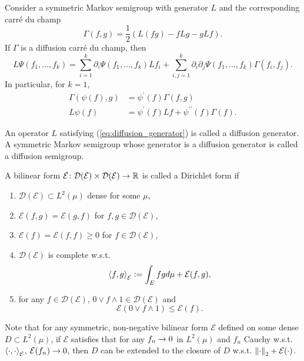 Consider a symmetric Markov semigroup with generator $L$ and the corresponding carr\'e du champ
\begin{equation*}
	\Gamma(f, g)=\frac{1}{2}(L(f g)-f L g-g L f).
\end{equation*}
If $\Gamma$ is a diffusion carr\'e du champ, then
\begin{equation}\label{eq:diffusion_generator}
	L \Psi\left(f_1, \ldots, f_k\right)=\sum_{i=1}^k \partial_i \Psi\left(f_1, \ldots, f_k\right) L f_i+\sum_{i, j=1}^k \partial_i \partial_j \Psi\left(f_1, \ldots, f_k\right) \Gamma\left(f_i, f_j\right).
\end{equation}
In particular, for $k = 1$,
\begin{align*}
	\Gamma(\psi(f), g) & =\psi^{\prime}(f) \Gamma(f, g) \\
	L \psi(f) & =\psi^{\prime}(f) L f+\psi^{\prime \prime}(f) \Gamma(f).
\end{align*}

\begin{defn}
    An operator $L$ satisfying (\ref{eq:diffusion_generator}) is called a diffusion generator. A symmetric Markov semigroup whose generator is a diffusion generator is called a diffusion semigroup.
\end{defn}

\begin{defn}
    A bilinear form $\mathcal{E} \colon \mathcal{D}(\mathcal{E}) \times \mathcal{D}(\mathcal{E}) \rightarrow \mathbb{R}$ is called a Dirichlet form if
    \begin{enumerate}[label=(\roman*)]
    	\item $\mathcal{D}(\mathcal{E}) \subset L^2(\mu)$ dense for some $\mu$,
    	\item $\mathcal{E}(f,g) = \mathcal{E}(g,f)$ for $f,g \in \mathcal{D}(\mathcal{E})$,
    	\item $\mathcal{E}(f) = \mathcal{E}(f,f) \geq 0$ for $f \in \mathcal{D}(\mathcal{E})$,
    	\item $\mathcal{D}(\mathcal{E})$ is complete w.s.t. 
    	\begin{equation*}
    		\left\langle f,g \right\rangle_{\mathcal{E}} \vcentcolon= \int_Efgd\mu + \mathcal{E}(f,g),
    	\end{equation*}
    	\item for any $f \in \mathcal{D}(\mathcal{E})$, $0 \vee f \wedge 1 \in \mathcal{D}(\mathcal{E})$ and
    	\begin{equation*}
    		\mathcal{E}(0 \vee f \wedge 1) \leq \mathcal{E}(f).
    	\end{equation*}
    \end{enumerate}
\end{defn}
\begin{rmk}
    Note that for any symmetric, non-negative bilinear form $\mathcal{E}$ defined on some dense $D \subset L^2(\mu)$, if $\mathcal{E}$ satisfies that for any $f_n \rightarrow 0$ in $L^2(\mu)$ and $f_n$ Cauchy w.s.t. $\left\langle \cdot,\cdot \right\rangle_{\mathcal{E}}$, $\mathcal{E}(f_n) \rightarrow 0$, then $D$ can be extended to the closure of $D$ w.s.t. $\left\lVert\cdot\right\lVert_2+\mathcal{E}(\cdot)$.
\end{rmk}

